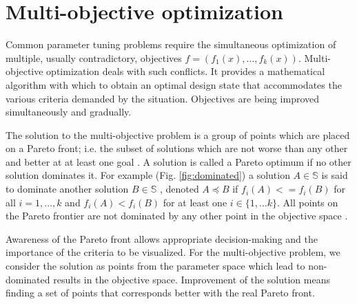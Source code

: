     

    \section{Multi-objective optimization}
        Common parameter tuning problems require the simultaneous optimization of multiple, usually contradictory, objectives $f = (f_1(x), \ldots, f_k(x))$. Multi-objective optimization deals with such conflicts. It provides a mathematical algorithm with which to obtain an optimal design state that accommodates the various criteria demanded by the situation. Objectives are being improved simultaneously and gradually.

        The solution to the multi-objective problem is a group of points which are placed on a Pareto front; i.e. the subset of solutions which are not worse than any other and better at at least one goal \cite{KrallMD15}. A solution is called a Pareto optimum if no other solution dominates it. For example (Fig. \ref{fig:dominated}) a solution $A \in \mathbb{S}$ is said to dominate another solution $B \in \mathbb{S}$ , denoted $A \preceq B$ if $f_i(A)<=f_i(B)$ for all $i=1, \ldots ,k$ and $f_i(A)<f_i(B)$ for at least one $i \in \{1, \ldots k\}$. All points on the Pareto frontier are not dominated by any other point in the objective space \cite{Kaisa0021267}.  

        Awareness of the Pareto front allows appropriate decision-making and the importance of the criteria to be visualized. For the multi-objective problem, we consider the solution as points from the parameter space which lead to non-dominated results in the objective space. Improvement of the solution means finding a set of points that corresponds better with the real Pareto front.

